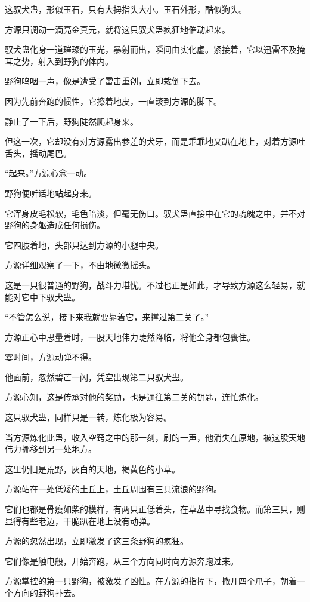 \begin{this_body}
这驭犬蛊，形似玉石，只有大拇指头大小。玉石外形，酷似狗头。

方源只调动一滴亮金真元，就将这只驭犬蛊疯狂地催动起来。

驭犬蛊化身一道璀璨的玉光，暴射而出，瞬间由实化虚。紧接着，它以迅雷不及掩耳之势，射入到野狗的体内。

野狗呜咽一声，像是遭受了雷击重创，立即栽倒下去。

因为先前奔跑的惯性，它擦着地皮，一直滚到方源的脚下。

静止了一下后，野狗陡然爬起身来。

但这一次，它却没有对方源露出参差的犬牙，而是乖乖地又趴在地上，对着方源吐舌头，摇动尾巴。

“起来。”方源心念一动。

野狗便听话地站起身来。

它浑身皮毛松软，毛色暗淡，但毫无伤口。驭犬蛊直接中在它的魂魄之中，并不对野狗的身躯造成任何损伤。

它四肢着地，头部只达到方源的小腿中央。

方源详细观察了一下，不由地微微摇头。

这是一只很普通的野狗，战斗力堪忧。不过也正是如此，才导致方源这么轻易，就能对它中下驭犬蛊。

“不管怎么说，接下来我就要靠着它，来撑过第二关了。”

方源正心中思量着时，一股天地伟力陡然降临，将他全身都包裹住。

霎时间，方源动弹不得。

他面前，忽然碧芒一闪，凭空出现第二只驭犬蛊。

方源心知，这是传承对他的奖励，也是通往第二关的钥匙，连忙炼化。

这只驭犬蛊，同样只是一转，炼化极为容易。

当方源炼化此蛊，收入空窍之中的那一刻，刷的一声，他消失在原地，被这股天地伟力挪移到另一处地方。

这里仍旧是荒野，灰白的天地，褐黄色的小草。

方源站在一处低矮的土丘上，土丘周围有三只流浪的野狗。

它们也都是骨瘦如柴的模样，有两只正低着头，在草丛中寻找食物。而第三只，则显得有些老迈，干脆趴在地上没有动弹。

方源的忽然出现，立即激发了这三条野狗的疯狂。

它们像是触电般，开始奔跑，从三个方向同时向方源奔跑过来。

方源掌控的第一只野狗，被激发了凶性。在方源的指挥下，撒开四个爪子，朝着一个方向的野狗扑去。


\end{this_body}

